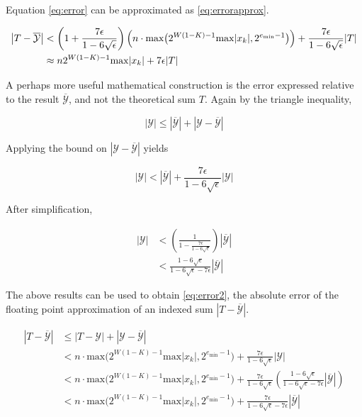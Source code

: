 \documentclass[12pt]{article}
\providecommand{\min}{\ensuremath{\text{min}}}
\providecommand{\max}{\ensuremath{\text{max}}}
\theoremstyle{definition}
\numberwithin{equation}{section}
\numberwithin{figure}{section}
\begin{document}
    Equation \eqref{eq:error} can be approximated as \eqref{eq:errorapprox}.

    \begin{align}
      \left|T - \overline{\mathcal{Y}}\right| &< \left(1 + \frac{7\epsilon}{1 - 6\sqrt\epsilon}\right) \Bigl(n \cdot \max\bigl(2^{W (1 - K) - 1} \max|x_k|, 2^{e_{\min} - 1}\bigr)\Bigr) + \frac{7\epsilon}{1 - 6\sqrt\epsilon} |T| \nonumber \\
    &\approx n 2^{W  (1 - K) - 1} \max|x_k| + 7  \epsilon |T|
      \label{eq:errorapprox}
    \end{align}

    A perhaps more useful mathematical construction is the error expressed relative to the result $\overline{\mathcal{Y}}$, and not the theoretical sum $T$. Again by the triangle inequality,

    \begin{equation*}
      |\mathcal{Y}| \leq \left|\overline{\mathcal{Y}}\right| + \left|\mathcal{Y} - \overline{\mathcal{Y}}\right|
    \end{equation*}

    Applying the bound on $|\mathcal{Y} - \overline{\mathcal{Y}}|$ yields

    \begin{equation*}
      |\mathcal{Y}| < \left|\overline{\mathcal{Y}}\right| + \frac{7\epsilon}{1 - 6\sqrt\epsilon}|\mathcal{Y}|
    \end{equation*}

    After simplification,

    \begin{align*}
      |\mathcal{Y}| &< \left(\frac{1}{1 - \frac{7\epsilon}{1 - 6\sqrt\epsilon}}\right)  \left|\overline{\mathcal{Y}}\right| \nonumber \\
      &< \frac{1 - 6 \sqrt\epsilon}{1 - 6 \sqrt \epsilon - 7\epsilon}  \left|\overline{\mathcal{Y}}\right|
    \end{align*}

    The above results can be used to obtain  \eqref{eq:error2}, the absolute error of the floating point approximation of an indexed sum $|T - \overline{\mathcal{Y}}|$.

    \begin{align}
      \left|T - \overline{\mathcal{Y}}\right| &\leq |T - \mathcal{Y}| + \left|\mathcal{Y} - \overline{\mathcal{Y}}\right| \nonumber \\
      &< n \cdot \max\bigl(2^{W  (1 - K) - 1}  \max|x_k|, 2^{e_{\min} - 1}\bigr) + \frac{7\epsilon}{1 - 6\sqrt\epsilon}|\mathcal{Y}| \nonumber \\
      &< n \cdot \max\bigl(2^{W  (1 - K) - 1}  \max|x_k|, 2^{e_{\min} - 1}\bigr) + \frac{7\epsilon}{1 - 6\sqrt\epsilon}\left(\frac{1 - 6 \sqrt\epsilon}{1 - 6 \sqrt \epsilon - 7\epsilon}\left|\overline{\mathcal{Y}}\right|\right) \nonumber \\
      &< n \cdot \max\bigl(2^{W  (1 - K) - 1}  \max|x_k|, 2^{e_{\min} - 1}\bigr) + \frac{7\epsilon}{1 - 6 \sqrt \epsilon - 7\epsilon}\left|\overline{\mathcal{Y}}\right|
      \label{eq:error2}
    \end{align}
\end{document}
